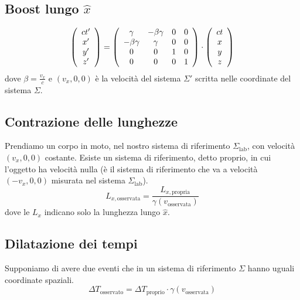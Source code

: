 \documentclass[10pt,a4paper]{article}
\begin{document}
\begin{multicols}{2}
  \subsection*{Boost lungo $\hat{x}$}
  \begin{displaymath}
    \left({\begin{array}{c} ct' \\ x' \\ y' \\ z' \\ \end{array}}\right) =
    \left({
      \begin{array}{cccc}
        \gamma & - \beta \gamma & 0 & 0 \\
        - \beta \gamma & \gamma & 0 & 0 \\
        0 & 0 & 1 & 0 \\
        0 & 0 & 0 & 1 \\
      \end{array}
    }\right) \cdot
    \left({\begin{array}{c} ct \\ x \\ y \\ z \\ \end{array}}\right)
  \end{displaymath}
  dove $\beta = \frac{v_x}{c}$ e $(v_x, 0, 0)$ è la velocità del sistema $\Sigma'$ scritta nelle coordinate del sistema $\Sigma$.

  \subsection*{Contrazione delle lunghezze}
  Prendiamo un corpo in moto, nel nostro sistema di riferimento $\Sigma_\text{lab}$, con velocità $(v_x, 0, 0)$ costante. Esiste un sistema di riferimento, detto proprio, in cui l'oggetto ha velocità nulla (è il sistema di riferimento che va a velocità $(-v_x, 0, 0)$ misurata nel sistema $\Sigma_\text{lab}$).
  $$ L_{x,\text{osservata}} = \frac{L_{x, \text{propria}}}{\gamma(v_\text{osservata})} $$
  dove le $L_x$ indicano solo la lunghezza lungo $\hat{x}$.
  
  \subsection*{Dilatazione dei tempi}
  Supponiamo di avere due eventi che in un sistema di riferimento $\Sigma$ hanno uguali coordinate spaziali.
  $$ \Delta T_\text{osservato} = \Delta T_\text{proprio} \cdot \gamma(v_\text{osservata}) $$


\end{multicols}
\end{document}

